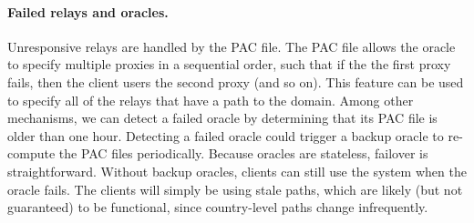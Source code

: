 \paragraph{Failed relays and oracles.} Unresponsive relays are handled
by the PAC file.  The PAC file allows the oracle to specify multiple
proxies in a sequential order, such that if the the first proxy fails,
then the client users the second proxy (and so on).  This feature can
be used to specify all of the relays that have a path to the domain.
Among other mechanisms, we can detect a failed oracle by determining
that its PAC file is older than one hour.  Detecting a failed oracle
could trigger a backup oracle to re-compute the PAC files
periodically.  Because oracles are stateless, failover is
straightforward.  Without backup oracles, clients can still use the
system when the oracle fails.  The clients will simply be using stale
paths, which are likely (but not guaranteed) to be functional, since
country-level paths change infrequently.


